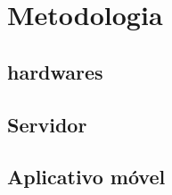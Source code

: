 \chapter{Metodologia}
\label{cap:metodologia}

\section{hardwares}
\label{metod:hardwares}

\section{Servidor}
\label{metod:servidor}

\section{Aplicativo móvel}
\label{metod:app}